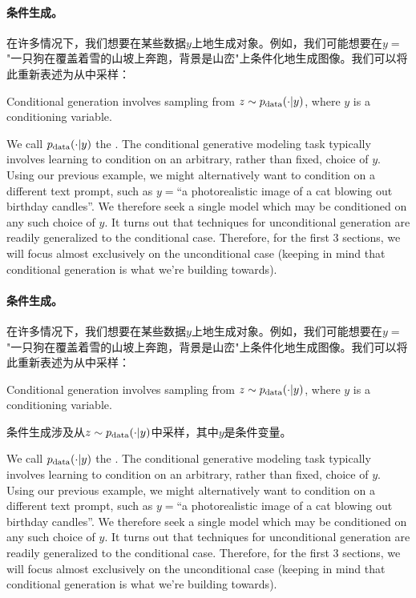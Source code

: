 \paragraph{条件生成。} 在许多情况下，我们想要在某些数据$y$上地生成对象。例如，我们可能想要在$y=$"一只狗在覆盖着雪的山坡上奔跑，背景是山峦"上条件化地生成图像。我们可以将此重新表述为从中采样：
\begin{ideabox}
    Conditional generation involves sampling from $z\sim p_{\rm{data}}(\cdot | y)$, where $y$ is a conditioning variable.
\end{ideabox}
We call $p_{\rm{data}}(\cdot|y)$ the . The conditional generative modeling task typically involves learning to condition on an arbitrary, rather than fixed, choice of $y$. Using our previous example, we might alternatively want to condition on a different text prompt, such as $y=$``a photorealistic image of a cat blowing out birthday candles''. We therefore seek a single model which may be conditioned on any such choice of $y$. It turns out that techniques for unconditional generation are readily generalized to the conditional case. Therefore, for the first 3 sections, we will focus almost exclusively on the unconditional case (keeping in mind that conditional generation is what we're building towards).

\paragraph{条件生成。} 在许多情况下，我们想要在某些数据$y$上地生成对象。例如，我们可能想要在$y=$"一只狗在覆盖着雪的山坡上奔跑，背景是山峦"上条件化地生成图像。我们可以将此重新表述为从中采样：
\begin{ideabox}
    Conditional generation involves sampling from $z\sim p_{\rm{data}}(\cdot | y)$, where $y$ is a conditioning variable.
\end{ideabox}

\begin{ideabox}[条件生成]
    条件生成涉及从$z\sim p_{\rm{data}}(\cdot | y)$中采样，其中$y$是条件变量。
\end{ideabox}
We call $p_{\rm{data}}(\cdot|y)$ the . The conditional generative modeling task typically involves learning to condition on an arbitrary, rather than fixed, choice of $y$. Using our previous example, we might alternatively want to condition on a different text prompt, such as $y=$``a photorealistic image of a cat blowing out birthday candles''. We therefore seek a single model which may be conditioned on any such choice of $y$. It turns out that techniques for unconditional generation are readily generalized to the conditional case. Therefore, for the first 3 sections, we will focus almost exclusively on the unconditional case (keeping in mind that conditional generation is what we're building towards).

